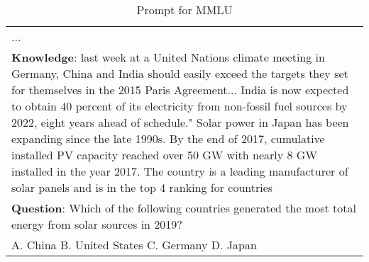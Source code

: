 \documentclass[nohyperref]{article}
\theoremstyle{plain}
\theoremstyle{definition}
\theoremstyle{remark}
\begin{document}
\begin{table*}
\begin{tabularx}{\textwidth}{m{17cm}}
... \\
\textbf{Knowledge}: last week at a United Nations climate meeting in Germany, China and India should easily exceed the targets they set for themselves in the 2015 Paris Agreement... India is now expected to obtain 40 percent of its electricity from non-fossil fuel sources by 2022, eight years ahead of schedule." Solar power in Japan has been expanding since the late 1990s. By the end of 2017, cumulative installed PV capacity reached over 50 GW with nearly 8 GW installed in the year 2017. The country is a leading manufacturer of solar panels and is in the top 4 ranking for countries \\
\textbf{Question}: Which of the following countries generated the most total energy from solar sources in 2019? \\
A. China
B. United States
C. Germany
D. Japan
 \\
\bottomrule
\end{tabularx}
\caption{Prompt for MMLU}
\label{tab:full_instructions1}
\end{table*}
\end{document}
